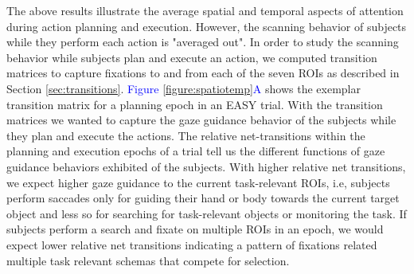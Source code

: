 The above results illustrate the average spatial and temporal aspects of attention during action planning and execution. However, the scanning behavior of subjects while they perform each action is "averaged out". In order to study the scanning behavior while subjects plan and execute an action, we computed transition matrices to capture fixations to and from each of the seven ROIs as described in Section \ref{sec:transitions}. \textcolor{Blue}{Figure \ref{figure:spatiotemp}A} shows the exemplar transition matrix for a planning epoch in an EASY trial. With the transition matrices we wanted to capture the gaze guidance behavior of the subjects while they plan and execute the actions. The relative net-transitions within the planning and execution epochs of a trial tell us the different functions of gaze guidance behaviors exhibited of the subjects. With higher relative net transitions, we expect higher gaze guidance to the current task-relevant ROIs, i.e, subjects perform saccades only for guiding their hand or body towards the current target object and less so for searching for task-relevant objects or monitoring the task. If subjects perform a search and fixate on multiple ROIs in an epoch, we would expect lower relative net transitions indicating a pattern of fixations related multiple task relevant schemas that compete for selection. 

